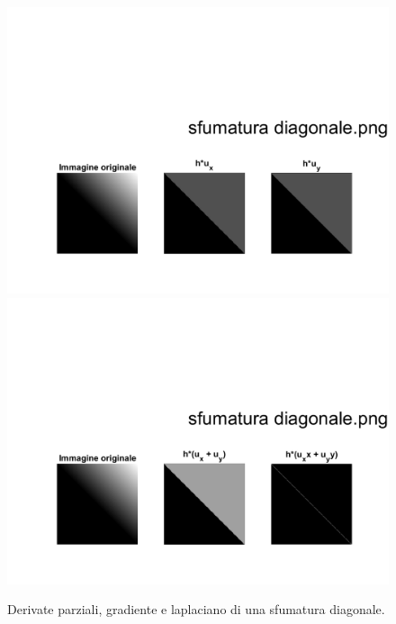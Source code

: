 \newpage
\begin{figure}   
\centering
\includegraphics[scale=0.4, trim = 0 0 0 10.5cm, clip]{Pictures/Risultati/sfumatura diagonale bianco e nero derivate parziali.png}
\includegraphics[scale=0.4, trim = 0 0 0 10.5cm, clip]{Pictures/Risultati/sfumatura diagonale bianco e nero gradiente e laplaciano.png}
\caption{Derivate parziali, gradiente e laplaciano di una sfumatura diagonale.}\label{fig:figura}
\end{figure}

